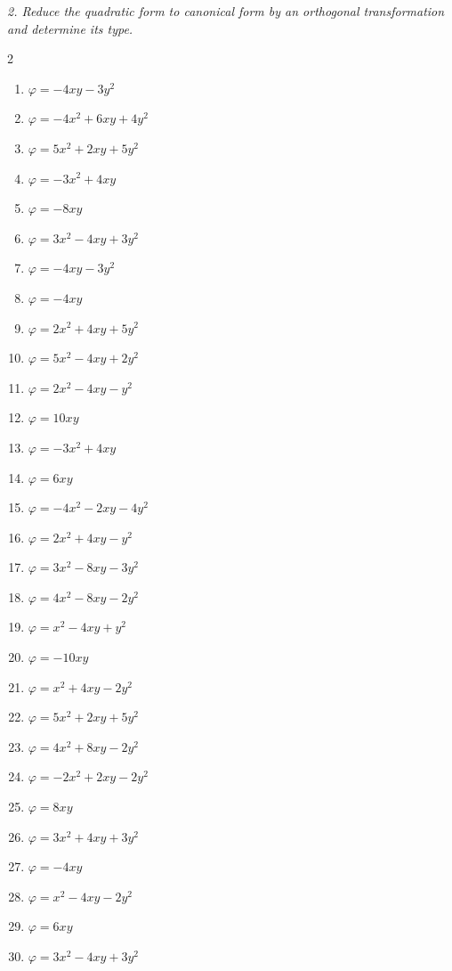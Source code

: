\emph{2. Reduce the quadratic form to canonical form by an orthogonal transformation and determine its type.}
\bigskip
\begin{multicols}{2}\raggedright
\begin{enumerate}[label=\arabic*., leftmargin=*]
\item $\varphi=-4xy-3y^2$
\item $\varphi=-4x^2+6xy+4y^2$
\item $\varphi=5x^2+2xy+5y^2$
\item $\varphi=-3x^2+4xy$
\item $\varphi=-8xy$
\item $\varphi=3x^2-4xy+3y^2$
\item $\varphi=-4xy-3y^2$
\item $\varphi=-4xy$
\item $\varphi=2x^2+4xy+5y^2$
\item $\varphi=5x^2-4xy+2y^2$
\item $\varphi=2x^2-4xy-y^2$
\item $\varphi=10xy$
\item $\varphi=-3x^2+4xy$
\item $\varphi=6xy$
\item $\varphi=-4x^2-2xy-4y^2$
\item $\varphi=2x^2+4xy-y^2$
\item $\varphi=3x^2-8xy-3y^2$
\item $\varphi=4x^2-8xy-2y^2$
\item $\varphi=x^2-4xy+y^2$
\item $\varphi=-10xy$
\item $\varphi=x^2+4xy-2y^2$
\item $\varphi=5x^2+2xy+5y^2$
\item $\varphi=4x^2+8xy-2y^2$
\item $\varphi=-2x^2+2xy-2y^2$
\item $\varphi=8xy$
\item $\varphi=3x^2+4xy+3y^2$
\item $\varphi=-4xy$
\item $\varphi=x^2-4xy-2y^2$
\item $\varphi=6xy$
\item $\varphi=3x^2-4xy+3y^2$
\end{enumerate}
\end{multicols}

